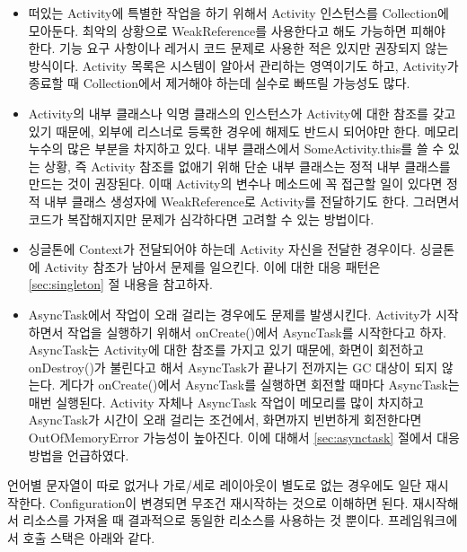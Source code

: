 \begin{itemize}
\item 떠있는 Activity에 특별한 작업을 하기 위해서 Activity 인스턴스를 Collection에 모아둔다. 최악의 상황으로 WeakReference를 사용한다고 해도 가능하면 피해야 한다. 
기능 요구 사항이나 레거시 코드 문제로 사용한 적은 있지만 권장되지 않는 방식이다. Activity 목록은 시스템이 알아서 관리하는 영역이기도 하고, Activity가 종료할 때 Collection에서 제거해야 하는데 실수로 빠뜨릴 가능성도 많다.

\item Activity의 내부 클래스나 익명 클래스의 인스턴스가 Activity에 대한 참조를 갖고 있기 때문에, 외부에 리스너로 등록한 경우에 해제도 반드시 되어야만 한다. 
메모리 누수의 많은 부분을 차지하고 있다. 내부 클래스에서 SomeActivity.this를 쓸 수 있는 상황, 즉 Activity 참조를 없애기 위해 단순 내부 클래스는 정적 내부 클래스를 만드는 것이 권장된다.
이때 Activity의 변수나 메소드에 꼭 접근할 일이 있다면 정적 내부 클래스 생성자에 WeakReference로 Activity를 전달하기도 한다. 
그러면서 코드가 복잡해지지만 문제가 심각하다면 고려할 수 있는 방법이다. 

\item 싱글톤에 Context가 전달되어야 하는데 Activity 자신을 전달한 경우이다. 싱글톤에 Activity 참조가 남아서 문제를 일으킨다. 이에 대한 대응 패턴은 \ref{sec:singleton} 절 내용을 참고하자.

\item AsyncTask에서 작업이 오래 걸리는 경우에도 문제를 발생시킨다. Activity가 시작하면서 작업을 실행하기 위해서 onCreate()에서 AsyncTask를 시작한다고 하자. 
AsyncTask는 Activity에 대한 참조를 가지고 있기 때문에, 화면이 회전하고 onDestroy()가 불린다고 해서 AsyncTask가 끝나기 전까지는 GC 대상이 되지 않는다. 
게다가 onCreate()에서 AsyncTask를 실행하면 회전할 때마다 AsyncTask는 매번 실행된다. 
Activity 자체나 AsyncTask 작업이 메모리를 많이 차지하고 AsyncTask가 시간이 오래 걸리는 조건에서, 화면까지 빈번하게 회전한다면 OutOfMemoryError 가능성이 높아진다. 
이에 대해서 \ref{sec:asynctask} 절에서 대응 방법을 언급하였다.
\end{itemize}

언어별 문자열이 따로 없거나 가로/세로 레이아웃이 별도로 없는 경우에도 일단 재시작한다. Configuration이 변경되면 무조건 재시작하는 것으로 이해하면 된다. 
재시작해서 리소스를 가져올 때 결과적으로 동일한 리소스를 사용하는 것 뿐이다. 프레임워크에서 호출 스택은 아래와 같다.

